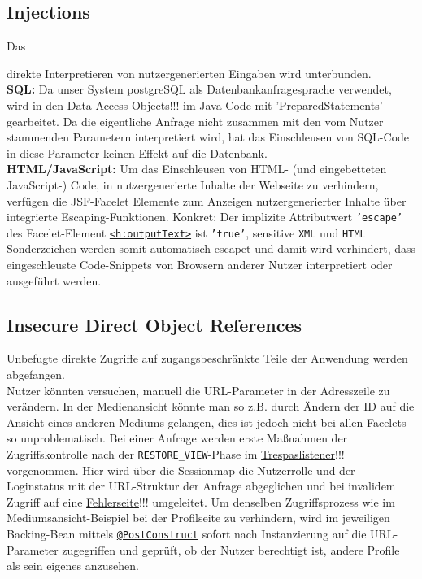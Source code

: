 \documentclass{article}
\begin{document}
\subsection{Injections}
\hypertarget{Injections}{Das} direkte Interpretieren von nutzergenerierten Eingaben wird unterbunden.\\
\textbf{SQL:} Da unser System postgreSQL als Datenbankanfragesprache verwendet, wird in den \hyperlink{DAOs}{Data Access Objects}!!! im Java-Code mit \hyperlink{https://docs.oracle.com/javase/7/docs/api/java/sql/PreparedStatement.html}{'PreparedStatements'} gearbeitet. Da die eigentliche Anfrage nicht zusammen mit den vom Nutzer stammenden Parametern interpretiert wird, hat das Einschleusen von SQL-Code in diese Parameter keinen Effekt auf die Datenbank.\\
\textbf{HTML/JavaScript:} \hypertarget{XSS}{Um} das Einschleusen von HTML- (und eingebetteten JavaScript-) Code, in nutzergenerierte Inhalte der Webseite zu verhindern, verfügen die JSF-Facelet Elemente zum Anzeigen nutzergenerierter Inhalte über integrierte Escaping-Funktionen. Konkret: Der implizite Attributwert \texttt{'escape'} des Facelet-Element \hyperlink{https://docs.oracle.com/javaee/7/javaserver-faces-2-2/vdldocs-facelets/h/outputText.html}{\texttt{<h:outputText>}} ist \texttt{'true'}, sensitive \texttt{XML} und \texttt{HTML} Sonderzeichen werden somit automatisch escapet und damit wird verhindert, dass eingeschleuste Code-Snippets von Browsern anderer Nutzer interpretiert oder ausgeführt werden.
\subsection{Insecure Direct Object References}
Unbefugte direkte Zugriffe auf zugangsbeschränkte Teile der Anwendung werden abgefangen.\\ 
Nutzer könnten versuchen, manuell die URL-Parameter in der Adresszeile zu verändern. In der Medienansicht könnte man so z.B. durch Ändern der ID auf die Ansicht eines anderen Mediums gelangen, dies ist jedoch nicht bei allen Facelets so unproblematisch. Bei einer Anfrage werden erste Maßnahmen der Zugriffskontrolle nach der \texttt{RESTORE\_VIEW}-Phase im \hyperlink{PhaseListener}{Trespaslistener}!!! vorgenommen. Hier wird über die Sessionmap die Nutzerrolle und der Loginstatus mit der URL-Struktur der Anfrage abgeglichen und bei invalidem Zugriff auf eine \hyperlink{invalidaccess}{Fehlerseite}!!! umgeleitet. Um denselben Zugriffsprozess wie im Mediumsansicht-Beispiel bei der Profilseite zu verhindern, wird im jeweiligen Backing-Bean mittels \hyperlink{https://docs.oracle.com/javaee/7/api/javax/annotation/PostConstruct.html}{\texttt{@PostConstruct}} sofort nach Instanzierung auf die URL-Parameter zugegriffen und geprüft, ob der Nutzer berechtigt ist, andere Profile als sein eigenes anzusehen. 
\end{document}
